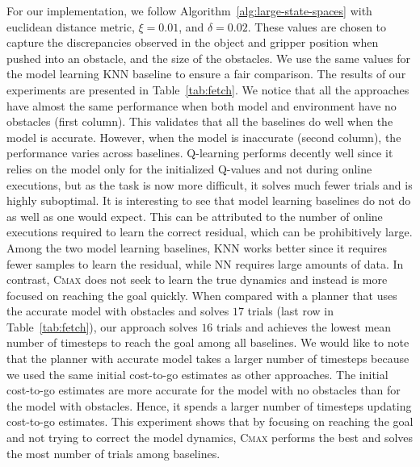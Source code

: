 For our implementation, we follow Algorithm~\ref{alg:large-state-spaces}
with euclidean distance metric, $\xi = 0.01$, and $\delta =
0.02$. These values are chosen to capture the discrepancies observed
in the object and gripper position when pushed into an obstacle, and the size of
the obstacles. We use the same values for the model learning KNN
baseline to ensure a fair comparison. The results of our experiments are
presented in Table~\ref{tab:fetch}. We notice that all the approaches
have almost the same performance when both model and environment have
no obstacles (first column). This validates that all the baselines
do well when the model is accurate. However, when the model is
inaccurate (second column), the performance varies across baselines.
Q-learning performs decently well since it relies on the model only
for the initialized Q-values and not during online executions, but as
the task is now more difficult, it solves much fewer trials and is
highly suboptimal. It is
interesting to see that model learning baselines do 
not do as well as one would expect. This can be attributed to the
number of online executions required to learn the correct residual,
which can be prohibitively large. Among 
the two model learning baselines, KNN works better since it requires
fewer samples to learn the residual, while NN requires large amounts of
data. In contrast, \textsc{Cmax} does not seek to learn the true
dynamics and instead is more focused on reaching the goal
quickly. When compared with a planner that uses the accurate model with
obstacles and solves $17$ trials (last row in Table~\ref{tab:fetch}),
our approach solves $16$ trials and achieves the lowest mean 
number of timesteps to reach the goal among all baselines.
We would like to note that the planner with accurate model takes a larger number of timesteps because
we used the same initial cost-to-go estimates as other approaches.
The initial cost-to-go estimates are more accurate for the model
with no obstacles than for the model with obstacles. Hence, it spends a
larger number of timesteps updating cost-to-go estimates.
This experiment shows that by focusing on reaching the goal and not
trying to correct the model 
dynamics, \textsc{Cmax} performs the best and solves the most number of
trials among baselines.

